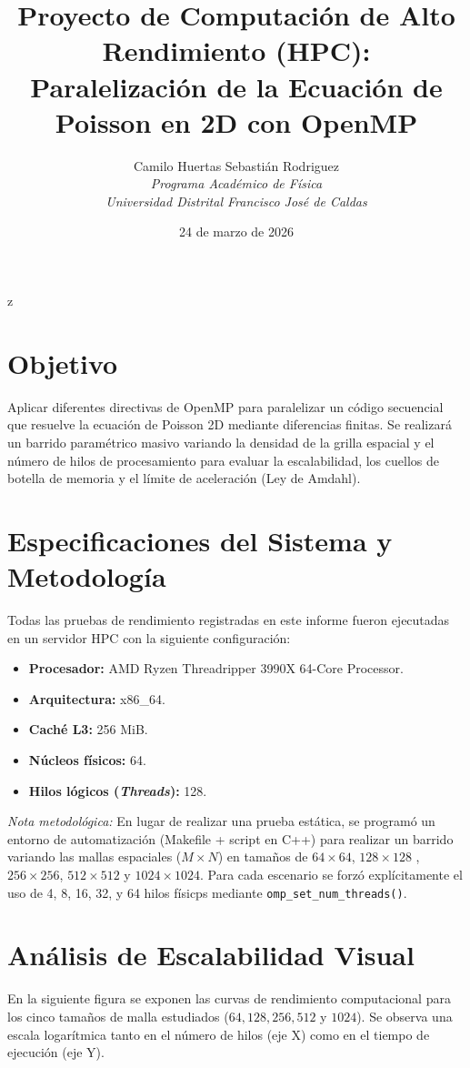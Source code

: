 z\documentclass[11pt,a4paper]{article}
\title{\textbf{Proyecto de Computación de Alto Rendimiento (HPC): \\ Paralelización de la Ecuación de Poisson en 2D con OpenMP}}
\author{
    \begin{tabular}{c}
    Camilo Huertas \quad Sebastián Rodriguez \\
    \textit{Programa Académico de Física} \\
    \textit{Universidad Distrital Francisco José de Caldas} \\
    \end{tabular}
}
\date{24 de marzo de 2026}
\begin{document}
\maketitle

\section*{Objetivo}
Aplicar diferentes directivas de OpenMP para paralelizar un código secuencial que resuelve la ecuación de Poisson 2D mediante diferencias finitas. Se realizará un barrido paramétrico masivo variando la densidad de la grilla espacial y el número de hilos de procesamiento para evaluar la escalabilidad, los cuellos de botella de memoria y el límite de aceleración (Ley de Amdahl).

\section*{Especificaciones del Sistema y Metodología}
Todas las pruebas de rendimiento registradas en este informe fueron ejecutadas en un servidor HPC con la siguiente configuración:
\begin{itemize}
    \item \textbf{Procesador:} AMD Ryzen Threadripper 3990X 64-Core Processor.
    \item \textbf{Arquitectura:} x86\_64.
    \item \textbf{Caché L3:} 256 MiB.
    \item \textbf{Núcleos físicos:} 64.
    \item \textbf{Hilos lógicos (\textit{Threads}):} 128.
\end{itemize}

\textit{Nota metodológica:} En lugar de realizar una prueba estática, se programó un entorno de automatización (Makefile + script en C++) para realizar un barrido variando las mallas espaciales ($M \times N$) en tamaños de $64\times64$, $128\times128$ , $256\times256$, $512\times512$ y $1024\times1024$. Para cada escenario se forzó explícitamente el uso de  4, 8, 16, 32, y 64 hilos físicps  mediante \texttt{omp\_set\_num\_threads()}.

\section*{Análisis de Escalabilidad Visual}

En la siguiente figura se exponen las curvas de rendimiento computacional para los cinco tamaños de malla estudiados ($64, 128, 256, 512$ y $1024$). Se observa una escala logarítmica tanto en el número de hilos (eje X) como en el tiempo de ejecución (eje Y).
\end{document}
